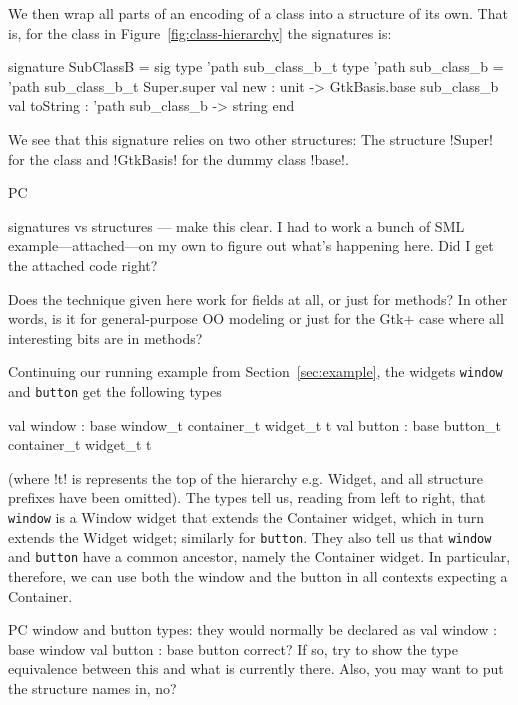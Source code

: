 \documentclass[workingdraft]{usetex-v1}
\begin{document}
We then wrap all parts of an encoding of a class into a structure of
its own.  That is, for the class  in
Figure~\ref{fig:class-hierarchy} the \sml signatures is:
\begin{SMLcode}
signature SubClassB =
sig
  type 'path sub_class_b_t
  type 'path sub_class_b = 
         'path sub_class_b_t Super.super
  val new : unit 
            -> GtkBasis.base sub_class_b 
  val toString : 'path sub_class_b 
                               -> string
end
\end{SMLcode}
We see that this signature relies on two other structures:  The
structure !Super! for the class  and !GtkBasis! for
the dummy class !base!.

\begin{ednote}{PC}
  
signatures vs structures --- make this clear.  I had to work
a bunch of SML example---attached---on my own to figure out
what's happening here.  Did I get the attached code right?

Does the technique given here work for fields at all, or
just for methods?  In other words, is it for general-purpose
OO modeling or just for the Gtk+ case where all interesting
bits are in methods?

\end{ednote}

Continuing our running example from Section~\ref{sec:example},
the widgets \texttt{window} and \texttt{button} get the following
types
\begin{SMLcode}
val window : 
       base window_t container_t widget_t t
val button : 
       base button_t container_t widget_t t
\end{SMLcode}
(where !t! is represents the top of the hierarchy e.g. Widget, and all
structure prefixes have been omitted).  The types tell us, reading from
left to right, that \texttt{window} is a Window widget that extends
the Container widget, which in turn extends the Widget widget;
similarly for \texttt{button}. They also tell us that \texttt{window}
and \texttt{button} have a common ancestor, namely the Container
widget.  In particular, therefore, we can use both the window and the
button in all contexts expecting a Container.

\begin{ednote}{PC}
  window and button types: they would normally be declared as
  val window : base window
  val button : base button
correct?  If so, try to show the type equivalence between
this and what is currently there.  Also, you may want to put
the structure names in, no?

\end{ednote}
\end{document}
